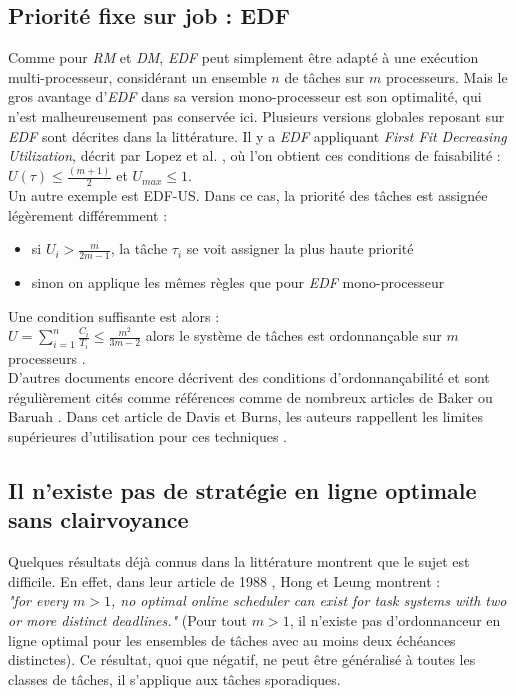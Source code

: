 \documentclass[11pt,a4paper,oneside]{report}
\begin{document}
\subsection{Priorité fixe sur job : EDF}
Comme pour \textit{RM} et \textit{DM}, \textit{EDF} peut simplement être adapté à une exécution multi-processeur, 
considérant un ensemble $n$ de tâches sur $m$ processeurs. Mais le gros avantage d'\textit{EDF} 
dans sa version mono-processeur est son optimalité, qui n'est malheureusement pas conservée ici. 
Plusieurs versions globales reposant sur \textit{EDF} sont décrites dans la littérature. 
Il y a \textit{EDF} appliquant \textit{First Fit Decreasing Utilization}, décrit par 
Lopez et al. \cite{lopez_utilization_2004}, où l'on obtient ces conditions de faisabilité : \\
$U(\tau) \leq \frac{(m + 1)}{2}$ et $U_{max} \leq 1$. \\
Un autre exemple est EDF-US. 
Dans ce cas, la priorité des tâches est assignée légèrement différemment :\\
\begin{itemize}
	\item si $U_i > \frac{m}{2m-1}$, la tâche $\tau_i$ se voit assigner la plus haute priorité
	\item sinon on applique les mêmes règles que pour \textit{EDF} mono-processeur
\end{itemize}
Une condition suffisante est alors :\\
$U = \sum_{i=1}^{n}\frac{C_i}{T_i} \leq \frac{m^2}{3m-2}$
alors le système de tâches est ordonnançable sur $m$ processeurs
\cite{andersson_static-priority_2001}. \\
D'autres documents encore décrivent des conditions d'ordonnançabilité et sont régulièrement 
cités comme références comme de nombreux articles de Baker 
\cite{baker_multiprocessor_2003} \cite{baker_analysis_2005} ou Baruah \cite{baruah_optimal_2004}
\cite{baruah_schedulability_2008}. 
Dans cet article de Davis et Burns, les auteurs rappellent les 
limites supérieures d'utilisation pour ces techniques \cite{davis_survey_2011}.\\


\subsection{Il n'existe pas de stratégie en ligne optimale sans clairvoyance}
Quelques résultats déjà connus dans la littérature montrent que le sujet est difficile. 
En effet, dans leur article de 1988 \cite{hong_-line_1988}, Hong et Leung montrent :\\
\textit{"for every $m > 1$, no optimal online scheduler can exist for task systems with two or more distinct
	deadlines."} (Pour tout $m > 1$, il n'existe pas d'ordonnanceur en ligne 
optimal pour les ensembles de tâches avec au moins deux échéances distinctes). 
Ce résultat, quoi que négatif, ne peut être généralisé à toutes les classes de tâches, il s'applique 
aux tâches sporadiques. 
\end{document}
